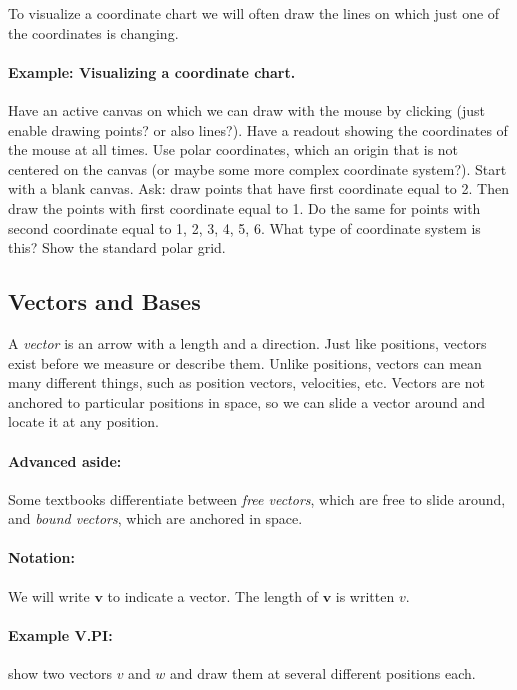\documentclass{article}
\renewcommand{\vec}[1]{\boldsymbol{#1}}
\begin{document}
To visualize a coordinate chart we will often draw the lines on which
just one of the coordinates is changing.

\paragraph{Example: Visualizing a coordinate chart.} Have an active
canvas on which we can draw with the mouse by clicking (just enable
drawing points? or also lines?). Have a readout showing the
coordinates of the mouse at all times. Use polar coordinates, which an
origin that is not centered on the canvas (or maybe some more complex
coordinate system?). Start with a blank canvas. Ask: draw points that
have first coordinate equal to 2. Then draw the points with first
coordinate equal to 1. Do the same for points with second coordinate
equal to 1, 2, 3, 4, 5, 6. What type of coordinate system is this?
Show the standard polar grid.

\subsection{Vectors and Bases}

A \emph{vector} is an arrow with a length and a direction. Just like
positions, vectors exist before we measure or describe them. Unlike
positions, vectors can mean many different things, such as position
vectors, velocities, etc. Vectors are not anchored to particular
positions in space, so we can slide a vector around and locate it at
any position.

\paragraph{Advanced aside:} Some textbooks differentiate between
\emph{free vectors}, which are free to slide around, and \emph{bound
  vectors}, which are anchored in space.

\paragraph{Notation:} We will write $\vec{v}$ to indicate a
vector. The length of $\vec{v}$ is written $v$.

\paragraph{Example V.PI:} show two vectors $v$ and $w$ and draw them at
several different positions each.
\end{document}
